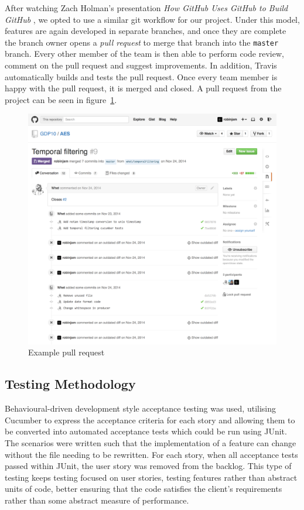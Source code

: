 \documentclass[a4paper, 12pt, twoside]{article}
\begin{document}
After watching Zach Holman's presentation \emph{How GitHub Uses GitHub to Build GitHub} \cite{hgugtbg}, we opted to use a similar git workflow for our project. Under this model, features are again developed in separate branches, and once they are complete the branch owner opens a \emph{pull request} to merge that branch into the \texttt{master} branch. Every other member of the team is then able to perform code review, comment on the pull request and suggest improvements. In addition, Travis automatically builds and tests the pull request. Once every team member is happy with the pull request, it is merged and closed. A pull request from the project can be seen in figure~\ref{fig:pull_request}.

\begin{figure}
  \includegraphics[width=\linewidth]{pull_request.png}
  \caption{Example pull request}
  \label{fig:pull_request}
\end{figure}

\subsection{Testing Methodology}
\label{sec:plan_testing_methodology}

Behavioural-driven development style acceptance testing was used, utilising Cucumber to express the acceptance criteria for each story and allowing them to be converted into automated acceptance tests which could be run using JUnit. The scenarios were written such that the implementation of a feature can change without the file needing to be rewritten. For each story, when all acceptance tests passed within JUnit, the user story was removed from the backlog. This type of testing keeps testing focused on user stories, testing features rather than abstract units of code, better ensuring that the code satisfies the client's requirements rather than some abstract measure of performance.
\end{document}
